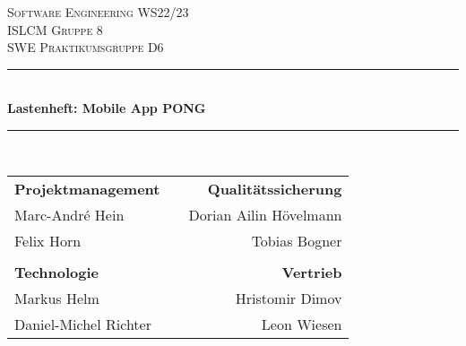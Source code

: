 
\begin{titlepage} %
	\newcommand{\HRule}{\rule{\linewidth}{0.5mm}} %
	
	\center %
	
	
	\textsc{\LARGE Software Engineering WS22/23}\\[1.5cm] %
	
	\textsc{\Large ISLCM Gruppe 8}\\[0.5cm] %
	
	\textsc{\large SWE Praktikumsgruppe D6}\\[0.5cm] %
	
	
	\HRule\\[0.4cm]
	{\huge\bfseries Lastenheft: Mobile App PONG}\\[0cm] %
	\HRule\\[0.4cm]
	
	
    \begin{xltabular}{\linewidth}{l X r}
        \textbf{Projektmanagement} & & \textbf{Qualitätssicherung} \\
        Marc-André Hein         & & Dorian Ailin Hövelmann                  \\
        Felix Horn              & & Tobias Bogner               \\
        & & \\
        \textbf{Technologie}    & & \textbf{Vertrieb}           \\
        Markus Helm             & & Hristomir Dimov             \\
        Daniel-Michel Richter   & & Leon Wiesen                 \\
    \end{xltabular}
    \label{tab:table_of_members}
    
    
	

\end{titlepage}
